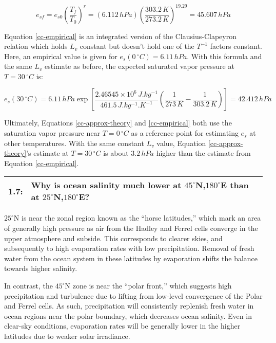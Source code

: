 \documentclass[12pt]{article}
\newcommand*{\problem}[2]{
    \begin{table}[ht]
    \centering
        \begin{tabular}{ | p{.1\linewidth} p{.9\linewidth} | }
            \hline
            \vspace{.3em}\textbf{\large#1:} & \vspace{.3em}\small{#2}\hspace{.2em}\vspace{.5em} \\ \hline
        \end{tabular}
    \end{table}
}
\begin{document}
\[
    e_{sf} = e_{s0} \left(\frac{T_f}{T_0}\right)^r = (6.112\,\si{hPa})\left(\frac{303.2\,\si{K}}{273.2\,\si{K}}\right)^{19.29} = 45.607\,\si{hPa}
\]

Equation \ref{cc-empirical} is an integrated version of the Clausius-Clapeyron relation which holds $L_v$ constant but doesn't hold one of the $T^{-1}$ factors constant. Here, an empirical value is given for $e_s(0\,^\circ\si{C}) = 6.11\,\si{hPa}$. With this formula and the same $L_v$ estimate as before, the expected saturated vapor pressure at $T=30\,^\circ\si{C}$ is:

\[
    e_{s}(30\,^\circ\si{C}) = 6.11\,\si{hPa} \exp \left[\frac{2.46545\times10^6\,\si{J.kg^{-1}}}{461.5\,\si{J.kg^{-1}.K^{-1}}}\left(\frac{1}{273\,\si{K}}-\frac{1}{303.2\,\si{K}}\right)\right] = 42.412\,\si{hPa}
\]

Ultimately, Equations \ref{cc-approx-theory} and \ref{cc-empirical} both use the saturation vapor pressure near $T=0\,^\circ\si{C}$ as a reference point for estimating $e_s$ at other temperatures. With the same constant $L_v$ value, Equation \ref{cc-approx-theory}'s estimate at $T=30\,^\circ\si{C}$ is about $3.2\,\si{hPa}$ higher than the estimate from Equation \ref{cc-empirical}.

\problem{1.7}{Why is ocean salinity much lower at $45^\circ$N,$180^\circ$E than at $25^\circ$N,$180^\circ$E?}

$25^\circ$N is near the zonal region known as the ``horse latitudes,'' which mark an area of generally high pressure as air from the Hadley and Ferrel cells converge in the upper atmosphere and subside. This corresponds to clearer skies, and subsequently to high evaporation rates with low precipitation. Removal of fresh water from the ocean system in these latitudes by evaporation shifts the balance towards higher salinity.

In contrast, the $45^\circ$N zone is near the ``polar front,'' which suggests high precipitation and turbulence due to lifting from low-level convergence of the Polar and Ferrel cells. As such, precipitation will consistently replenish fresh water in ocean regions near the polar boundary, which decreases ocean salinity. Even in clear-sky conditions, evaporation rates will be generally lower in the higher latitudes due to weaker solar irradiance.
\end{document}
